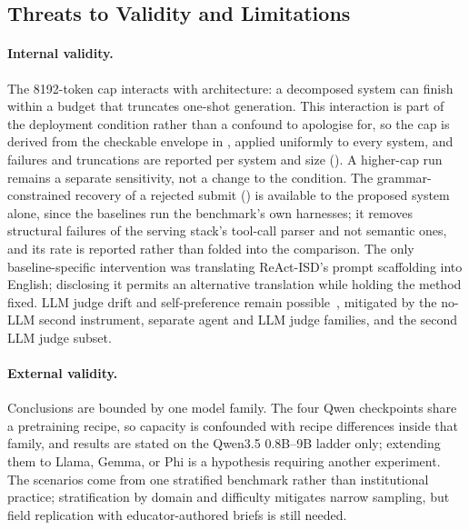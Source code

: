 \subsection{Threats to Validity and Limitations}
\label{sec:threats-limitations}

\paragraph{Internal validity.}
The 8192-token cap interacts with architecture: a decomposed system can finish
within a budget that truncates one-shot generation. This interaction is part of the
deployment condition rather than a confound to apologise for, so the cap is derived
from the checkable envelope in , applied uniformly to every
system, and failures and truncations are reported per system and size
(). A higher-cap run remains a separate sensitivity, not a
change to the condition. The grammar-constrained recovery of a rejected submit
() is available to the proposed system alone, since the
baselines run the benchmark's own harnesses; it removes structural failures of the
serving stack's tool-call parser and not semantic ones, and its rate is reported
rather than folded into the comparison. The only baseline-specific intervention was translating
ReAct-ISD's prompt scaffolding into English; disclosing it permits an alternative
translation while holding the method fixed. LLM judge drift and self-preference remain
possible~\cite{panickssery2024llm}, mitigated by the no-LLM second instrument,
separate agent and LLM judge families, and the second LLM judge subset.

\paragraph{External validity.}
Conclusions are bounded by one model family. The four Qwen checkpoints share a
pretraining recipe, so capacity is confounded with recipe differences inside that
family, and results are stated on the Qwen3.5 0.8B--9B ladder only; extending them to
Llama, Gemma, or Phi is a hypothesis requiring another experiment. The scenarios come
from one stratified benchmark rather than institutional practice; stratification by
domain and difficulty mitigates narrow sampling, but field replication with
educator-authored briefs is still needed.

